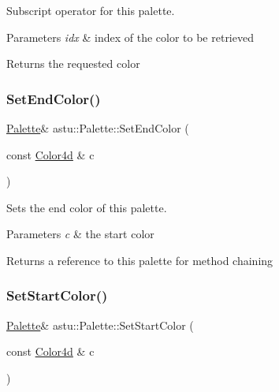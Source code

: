 Subscript operator for this palette.
\begin{DoxyItemize}
\item 
\begin{DoxyParams}{Parameters}
{\em idx} & index of the color to be retrieved \\
\hline
\end{DoxyParams}
\begin{DoxyReturn}{Returns}
the requested color 
\end{DoxyReturn}

\end{DoxyItemize}\mbox{\label{classastu_1_1Palette_a6eadba10ea3611ce4c54129df75eadc7}} 
\subsubsection{\texorpdfstring{Set\+End\+Color()}{SetEndColor()}}
{\footnotesize\ttfamily \hyperlink{classastu_1_1Palette}{Palette}\& astu\+::\+Palette\+::\+Set\+End\+Color (\begin{DoxyParamCaption}\item[{const \hyperlink{classastu_1_1Color}{Color4d} \&}]{c }\end{DoxyParamCaption})}

Sets the end color of this palette.


\begin{DoxyParams}{Parameters}
{\em c} & the start color \\
\hline
\end{DoxyParams}
\begin{DoxyReturn}{Returns}
a reference to this palette for method chaining 
\end{DoxyReturn}
\mbox{\label{classastu_1_1Palette_af32e6e54d464b2d999472ec1e39828c7}} 
\subsubsection{\texorpdfstring{Set\+Start\+Color()}{SetStartColor()}}
{\footnotesize\ttfamily \hyperlink{classastu_1_1Palette}{Palette}\& astu\+::\+Palette\+::\+Set\+Start\+Color (\begin{DoxyParamCaption}\item[{const \hyperlink{classastu_1_1Color}{Color4d} \&}]{c }\end{DoxyParamCaption})}

